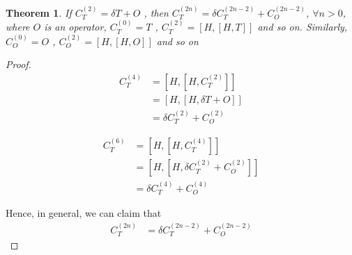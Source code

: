 \documentclass[11pt,a4paper]{article}
\newtheorem{thm}{Theorem}
\begin{document}
\begin{thm}
If $C^{(2)}_T=  \delta T + O$ , then $C^{(2n)}_T= \delta C^{(2n-2)}_T + C^{(2n-2)}_O  $, $\forall n>0$,  where $O$ is an operator,  $ C^{(0)}_T=T$ , $C^{(2)}_T=[H, [H, T]]$ and so on. Similarly,  $ C^{(0)}_O=O$ , $C^{(2)}_O=[H, [H, O]]$ and so on
\end{thm}

\begin{proof}

\begin{align}
C^{(4)}_T &= [H,[H,C^{(2)}_T]]\\
&=[H,[H, \delta T + O ]] \\
&=\delta C^{(2)}_T + C^{(2)}_O 
\end{align}

\begin{align}
C^{(6)}_T &= [H,[H,C^{(4)}_T]]\\
&=[H,[H, \delta C^{(2)}_T + C^{(2)}_O ]] \\
&=\delta C^{(4)}_T + C^{(4)}_O 
\end{align}

Hence, in general, we can claim that 
\begin{align*}
C^{(2n)}_T &=\delta C^{(2n-2)}_T + C^{(2n-2)}_O 
\end{align*}

\end{proof}


%
%
%
%
%
%
%
\end{document}
